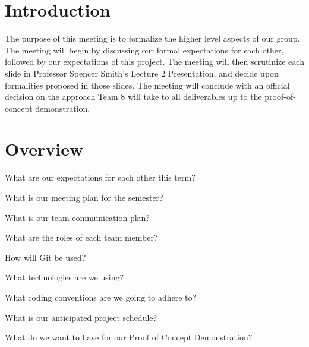 \documentclass[11pt]{meetingmins}
\begin{document}
\maketitle

\section{Introduction}
The purpose of this meeting is to formalize the higher level aspects of our 
group. The meeting will begin by discussing our formal expectations for each 
other, followed by our expectations of this project. The meeting will then 
scrutinize each slide in Professor Spencer Smith's Lecture 2 Presentation, and 
decide upon formalities proposed in those slides. The meeting will conclude with 
an official decision on the approach Team 8 will take to all deliverables up to 
the proof-of-concept demonstration. 

\section{Overview}
\begin{hiddenitems}

\item
What are our expectations for each other this term?

\item
What is our meeting plan for the semester?

\item
What is our team communication plan?

\item
What are the roles of each team member?

\item
How will Git be used?

\item
What technologies are we using?

\item
What coding conventions are we going to adhere to?

\item
What is our anticipated project schedule?

\item
What do we want to have for our Proof of Concept Demonstration?

\end{hiddenitems}
\end{document}
